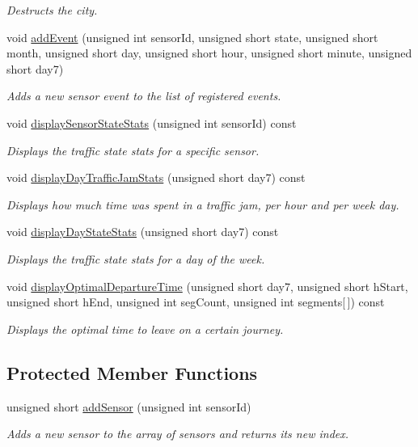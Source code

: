 \begin{DoxyCompactItemize}
\begin{DoxyCompactList}\small\item\em Destructs the city. \end{DoxyCompactList}\item 
void \hyperlink{class_city_a041daebe07d85d0d0f89a4cd5d5d7f0c}{add\+Event} (unsigned int sensor\+Id, unsigned short state, unsigned short month, unsigned short day, unsigned short hour, unsigned short minute, unsigned short day7)
\begin{DoxyCompactList}\small\item\em Adds a new sensor event to the list of registered events. \end{DoxyCompactList}\item 
void \hyperlink{class_city_a4a8f855a19201463bff2845ba2de7fbc}{display\+Sensor\+State\+Stats} (unsigned int sensor\+Id) const 
\begin{DoxyCompactList}\small\item\em Displays the traffic state stats for a specific sensor. \end{DoxyCompactList}\item 
void \hyperlink{class_city_a5432e2d3aacee2edfec716643cd38018}{display\+Day\+Traffic\+Jam\+Stats} (unsigned short day7) const 
\begin{DoxyCompactList}\small\item\em Displays how much time was spent in a traffic jam, per hour and per week day. \end{DoxyCompactList}\item 
void \hyperlink{class_city_a02ae75ced0120236da44141154e7e9a6}{display\+Day\+State\+Stats} (unsigned short day7) const 
\begin{DoxyCompactList}\small\item\em Displays the traffic state stats for a day of the week. \end{DoxyCompactList}\item 
void \hyperlink{class_city_a2e8b0b466e65c150b95fffecf5d7c1cb}{display\+Optimal\+Departure\+Time} (unsigned short day7, unsigned short h\+Start, unsigned short h\+End, unsigned int seg\+Count, unsigned int segments\mbox{[}$\,$\mbox{]}) const 
\begin{DoxyCompactList}\small\item\em Displays the optimal time to leave on a certain journey. \end{DoxyCompactList}\end{DoxyCompactItemize}
\subsection*{Protected Member Functions}
\begin{DoxyCompactItemize}
\item 
unsigned short \hyperlink{class_city_a58c4141414ef9073be9fbc60889c7822}{add\+Sensor} (unsigned int sensor\+Id)
\begin{DoxyCompactList}\small\item\em Adds a new sensor to the array of sensors and returns its new index. \end{DoxyCompactList}\end{DoxyCompactItemize}

